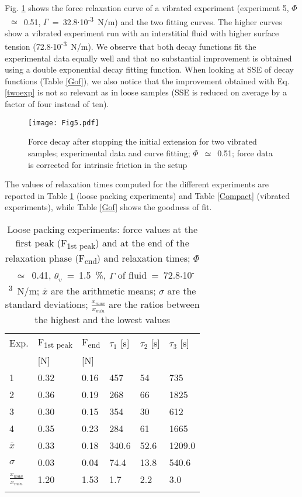 Fig. \ref{Vib_exp_5} shows the force relaxation curve of a vibrated experiment (experiment 5, $\Phi$~$\simeq$~0.51, $\Gamma$~=~32.8$\cdot$10\textsuperscript{-3}~\si{N/m}) and the two fitting curves. The higher curves show a vibrated experiment run with an interstitial fluid with higher surface tension (72.8$\cdot$10\textsuperscript{-3}~\si{N/m}). We observe that both decay functions fit the experimental data equally well and that no substantial improvement is obtained using a double exponential decay fitting function. When looking at SSE of decay functions (Table \ref{Gof}), we also notice that the improvement obtained with Eq. \eqref{twoexp} is not so relevant as in loose samples (SSE is reduced on average by a factor of four instead of ten).

\begin{figure}[h!]
\texttt{[image: Fig5.pdf]}
\caption{Force decay after stopping the initial extension for two vibrated samples; experimental data and curve fitting; $\Phi$~$\simeq$~0.51; force data is corrected for intrinsic friction in the setup}
\label{Vib_exp_5}
\end{figure}

The values of relaxation times computed for the different experiments are reported in Table \ref{Loose} (loose packing experiments) and Table \ref{Compact} (vibrated experiments), while Table \ref{Gof} shows the goodness of fit.

\begin{table}[h!]
\caption{Loose packing experiments: force values at the first peak (F\textsubscript{1st peak}) and at the end of the relaxation phase (F\textsubscript{end}) and relaxation times; $\Phi$~$\simeq$~0.41, $\theta_v$~=~1.5~\%, $\Gamma$ of fluid~=~72.8$\cdot$10\textsuperscript{-3}~\si{N/m}; $\overline{x}$ are the arithmetic means; $\sigma$ are the standard deviations; $\frac{x_{max}}{x_{min}}$ are the ratios between the highest and the lowest values}
\label{Loose}
\begin{tabular}{llllll}
\hline\noalign{\smallskip}
Exp. &  F\textsubscript{1st peak} & F\textsubscript{end} & $\tau_1$ [s] & $\tau_2$ [s] & $\tau_3$ [s]\\
& [N] & [N] & & &\\
\noalign{\smallskip}\hline\noalign{\smallskip}
1 & 0.32 & 0.16 & 457 & 54 & 735\\
2 & 0.36 & 0.19 & 268 & 66 & 1825\\
3 & 0.30 & 0.15 & 354 & 30 & 612\\
4 & 0.35 & 0.23 & 284 & 61 & 1665\\
\noalign{\smallskip}\hline\noalign{\smallskip}
$\overline{x}$ & 0.33 & 0.18 & 340.6 & 52.6 & 1209.0\\
$\sigma$ & 0.03 & 0.04 & 74.4 & 13.8 & 540.6\\
$\frac{x_{max}}{x_{min}}$ & 1.20 & 1.53 & 1.7 & 2.2 & 3.0\\
\noalign{\smallskip}\hline
\end{tabular} 
\end{table}

